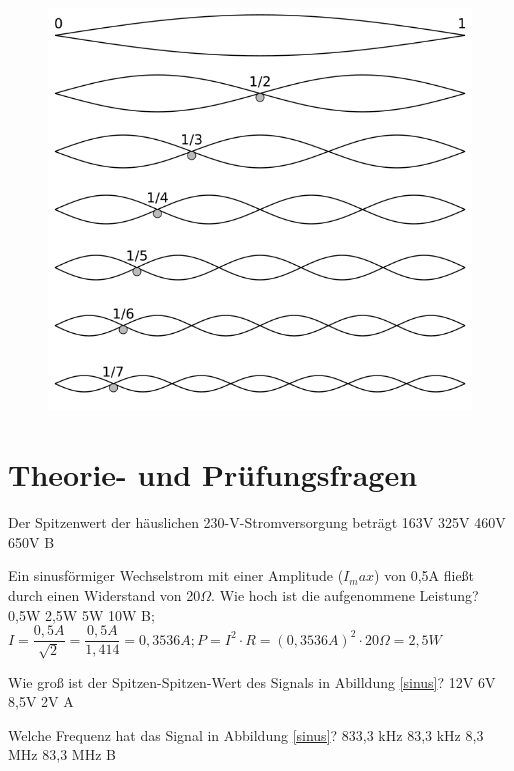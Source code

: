 \begin{figure}
 \vspace{-6cm}
 \includegraphics[scale=0.25]{Signale/Bilder/harmonische.png}
 \vspace{-6cm}
\end{figure}

\section*{Theorie- und Prüfungsfragen} 

{Der Spitzenwert der häuslichen 230-V-Stromversorgung beträgt}%
{163V}%
{325V}%
{460V}%
{650V}%
{B}%


{Ein sinusförmiger Wechselstrom mit einer Amplitude ($I_max$) von 0,5A fließt durch einen Widerstand von 20$\Omega$. Wie hoch ist die aufgenommene Leistung?}%
{0,5W}%
{2,5W}%
{5W}%
{10W}%
{B; $I = \dfrac{0,5A}{\sqrt{2}}= \dfrac{0,5A}{1,414} = 0,3536A; P=I^2\cdot R = (0,3536A)^2 \cdot 20 \Omega = 2,5W$}%

{Wie groß ist der Spitzen-Spitzen-Wert des Signals in Abilldung \ref{sinus}?}%
{12V}%
{6V}%
{8,5V}%
{2V}%
{A}%

{Welche Frequenz hat das Signal in Abbildung \ref{sinus}?}%
{833,3 kHz}%
{83,3 kHz}%
{8,3 MHz}%
{83,3 MHz}%
{B}%

